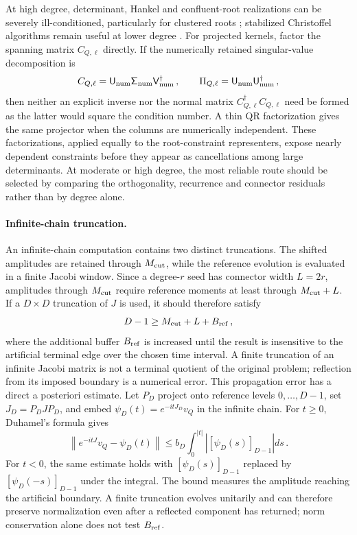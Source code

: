 \documentclass[a4paper,11pt]{article}
\def\dd{d}%
\def\ii{i}%
\def\ee{e}%
\def\Jac{J}%
\theoremstyle{definition}
\theoremstyle{remark}
\newcommand{\dd}{\mathrm d}
\newcommand{\ii}{\mathrm i}
\newcommand{\ee}{\mathrm e}
\newcommand{\Jac}{\mathsf J}
\begin{document}
At high degree, determinant, Hankel and confluent-root realizations can
be severely ill-conditioned, particularly for clustered roots
\cite{Gautschi2004}; stabilized Christoffel algorithms remain useful at
lower degree \cite{BuenoDopico2007}.  For projected kernels, factor the
spanning matrix $C_{Q,\ell}$ directly.  If the numerically retained singular-value
decomposition is
\begin{equation}
   C_{Q,\ell}
   =\mathsf U_{\rm num}\mathsf\Sigma_{\rm num}
      \mathsf V_{\rm num}^\dagger\,,
   \qquad
   \Pi_{Q,\ell}
   =\mathsf U_{\rm num}\mathsf U_{\rm num}^\dagger\,,
\end{equation}
then neither an explicit inverse nor the normal matrix
$C_{Q,\ell}^\dagger C_{Q,\ell}$ need be formed as the latter would square
the condition number.  A thin QR factorization gives the same projector
when the columns are numerically independent.    These factorizations, applied equally to the root-constraint representers, expose nearly dependent constraints before they appear as cancellations among large determinants.  At moderate or high
degree, the most reliable route should be selected by comparing the
orthogonality, recurrence and connector residuals rather than by degree
alone.

\paragraph{Infinite-chain truncation.}
An infinite-chain computation contains two distinct truncations.  The
shifted amplitudes are retained through $M_{\rm cut}$, while the
reference evolution is evaluated in a finite Jacobi window.  Since a
degree-$r$ seed has connector width $L=2r$, amplitudes through
$M_{\rm cut}$ require reference moments at least through
$M_{\rm cut}+L$.  If a $D\times D$ truncation of $\Jac$ is used, it
should therefore satisfy
\begin{equation}
   D-1\ge M_{\rm cut}+L+B_{\rm ref}\,,
\end{equation}
where the additional buffer $B_{\rm ref}$ is increased until the result
is insensitive to the artificial terminal edge over the chosen time
interval.  A finite truncation of an infinite Jacobi matrix is not a
terminal quotient of the original problem; reflection from its imposed
boundary is a numerical error.  This propagation error has a direct
a posteriori estimate.  Let $P_D$ project onto reference levels
$0,\ldots,D-1$, set $\Jac_D=P_D\Jac P_D$, and embed
$\psi_D(t)=\ee^{-\ii t\Jac_D}v_Q$ in the infinite chain.  For $t\geq 0$, Duhamel's formula gives
\begin{equation}
   \left\|
      \ee^{-\ii t\Jac}v_Q-\psi_D(t)
   \right\|
   \le
   b_D\int_0^{|t|}
      \left|[\psi_D(s)]_{D-1}\right|\dd s\,.
   \label{eq:numerical-boundary-residual-app}
\end{equation}
For $t<0$, the same estimate holds with
$[\psi_D(s)]_{D-1}$ replaced by $[\psi_D(-s)]_{D-1}$ under the
integral.
The bound measures the amplitude reaching the artificial boundary.  A
finite truncation evolves unitarily and can therefore preserve
normalization even after a reflected component has returned; norm
conservation alone does not test $B_{\rm ref}$.
\end{document}
